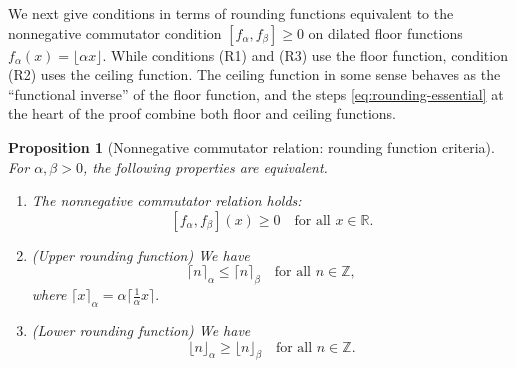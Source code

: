 \documentclass[11pt, letterpaper, reqno]{amsart}
\newtheorem{prop}[thm]{Proposition}
\theoremstyle{definition}
\numberwithin{equation}{section}
\newcommand{\RR}{\ensuremath{\mathbb{R}}}
\newcommand{\ZZ}{\ensuremath{\mathbb{Z}}}
\newcommand{\floor}[1]{\lfloor{#1}\rfloor}
\newcommand{\ceil}[1]{\lceil{#1}\rceil}
\begin{document}
We next give  conditions in terms of  rounding functions 
equivalent to the nonnegative commutator condition 
$[f_\alpha, f_\beta]\geq 0$ on dilated floor functions $f_\alpha(x) = \floor{\alpha x}$.
 While conditions (R1) and (R3) use the floor function,
 condition (R2) uses the ceiling function.
The ceiling function 
in some sense behaves as the 
``functional inverse'' of the floor function,
and the  steps \eqref{eq:rounding-essential} 
at the heart of the proof 
combine both floor and ceiling functions.
\begin{prop}[Nonnegative commutator relation: rounding function criteria]
\label{prop:rounding-pos}
For $\alpha, \beta > 0$, the following properties are equivalent.
\begin{enumerate}
\item[(R1)]  The  nonnegative commutator relation holds:
\[ 
[f_\alpha, f_\beta](x) \geq 0  \quad \mbox{for all } x \in \RR.
\]

\item[(R2)] (Upper rounding function) We have
\begin{equation*}
\ceil{n}_\alpha \leq \ceil{n}_\beta \quad\text{for all } n \in \ZZ,
\end{equation*}
where $\ceil{x}_\alpha = \alpha \ceil{\frac{1}{\alpha} x}.$

\item[(R3)]
(Lower rounding function) We have
\begin{equation*}
\floor{n}_{\alpha} \geq \floor{n}_{\beta} \quad\text{for all }n\in \ZZ.
\end{equation*}
\end{enumerate}
\end{prop}
\end{document}
